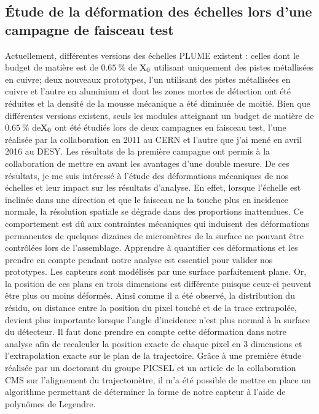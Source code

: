     \subsection{Étude de la déformation des échelles lors d'une campagne de faisceau test}

  Actuellement, différentes versions des échelles PLUME existent : celles dont le budget de matière est de $0.65~\%$ de $\rm{X_0}$ utilisant uniquement des pistes métallisées en cuivre; deux nouveaux prototypes, l'un utilisant des pistes métallisées en cuivre et l'autre en aluminium et dont les zones mortes de détection ont été réduites et la densité de la mousse mécanique a été diminuée de moitié.
  Bien que différentes versions existent, seuls les modules atteignant un budget de matière de $0.65~\%$ de$ \rm{X_0}$ ont été étudiés lors de deux campagnes en faisceau test, l'une réalisée par la collaboration en 2011 au CERN et l'autre que j'ai mené en avril 2016 au DESY.
  Les résultats de la première campagne ont permis à la collaboration de mettre en avant les avantages d'une double mesure. 
  De ces résultats, je me suis intéressé à l'étude des déformations mécaniques de nos échelles et leur impact sur les résultats d'analyse.
  En effet, lorsque l'échelle est inclinée dans une direction et que le faisceau ne la touche plus en incidence normale, la résolution spatiale se dégrade dans des proportions inattendues.
  Ce comportement est dû aux contraintes mécaniques qui induisent des déformations permanentes de quelques dizaines de micromètres de la surface ne pouvant être contrôlées lors de l'assemblage.
  Apprendre à quantifier ces déformations et les prendre en compte pendant notre analyse est essentiel pour valider nos prototypes.
  Les capteurs sont modélisés par une surface parfaitement plane.
  Or, la position de ces plans en trois dimensions est différente puisque ceux-ci peuvent être plus ou moins déformés.
  Ainsi comme il a été observé, la distribution du résidu, ou distance entre la position du pixel touché et de la trace extrapolée, devient plus importante lorsque l'angle d'incidence n'est plus normal à la surface du détecteur.
  Il faut donc prendre en compte cette déformation dans notre analyse afin de recalculer la position exacte de chaque pixel en 3 dimensions et l'extrapolation exacte sur le plan de la trajectoire. 
  Grâce à une première étude réalisée par un doctorant du groupe PICSEL et un article de la collaboration CMS sur l'alignement du trajectomètre\cite{CMSalignment}, il m'a été possible de mettre en place un algorithme permettant de déterminer la forme de notre capteur à l'aide de polynômes de Legendre. 
